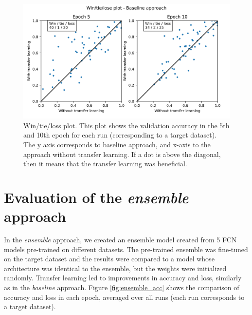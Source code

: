 \documentclass[a4paper,11pt,twoside]{report}
\theoremstyle{definition}
\begin{document}
\FloatBarrier
\begin{figure}[h!t]
\centering
\includegraphics[width=17 cm]{imgs/baseline/win_tie_lose_epoch.png}
\caption{Win/tie/loss plot. This plot shows the validation accuracy in the 5th and 10th epoch for each run (corresponding to a target dataset). The y axis corresponds to baseline approach, and x-axis to the approach without transfer learning. If a dot is above the diagonal, then it means that the transfer learning was beneficial.}
\label{fig:win_tie_loss_baseline}
\end{figure}

\FloatBarrier
\section{Evaluation of the \textit{ensemble} approach}
In the \textit{ensemble} approach, we created an ensemble model created from 5 FCN models pre-trained on different datasets. The pre-trained ensemble was fine-tuned on the target dataset and the results were compared to a model whose architecture was identical to the ensemble, but the weights were initialized randomly. Transfer learning led to improvements in accuracy and loss, similarly as in the \textit{baseline} approach. Figure \ref{fig:ensemble_acc} shows the comparison of accuracy and loss in each epoch, averaged over all runs (each run corresponds to a target dataset).

\FloatBarrier
\end{document}
